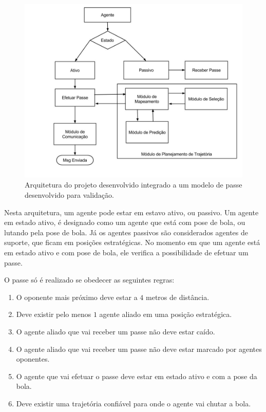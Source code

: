 \begin{figure}[H]
\centering
\includegraphics[scale=0.45]{figuras/ArquiteturaModelo.jpg}
\caption{Arquitetura do projeto desenvolvido integrado a um modelo de passe desenvolvido para validação.} 
\label{fig:arquitetura}
\end{figure}
\FloatBarrier

Nesta arquitetura, um agente pode estar em estavo ativo, ou passivo. Um agente em estado ativo, é designado como um agente que está com 
pose de bola, ou lutando pela pose de bola. Já os agentes passivos são considerados agentes de suporte, que ficam em posições estratégicas. No 
momento em que um agente está em estado ativo e com pose de bola, ele verifica a possibilidade de efetuar um passe.

O passe só é realizado se obedecer as seguintes regras:

\begin{enumerate}
 \item O oponente mais próximo deve estar a $4$ metros de distância.
 \item Deve existir pelo menos $1$ agente aliado em uma posição estratégica.
 \item O agente aliado que vai receber um passe não deve estar caído.
 \item O agente aliado que vai receber um passe não deve estar marcado por agentes oponentes.
 \item O agente que vai efetuar o passe deve estar em estado ativo e com a pose da bola.
 \item Deve existir uma trajetória confiável para onde o agente vai chutar a bola.
\end{enumerate}


